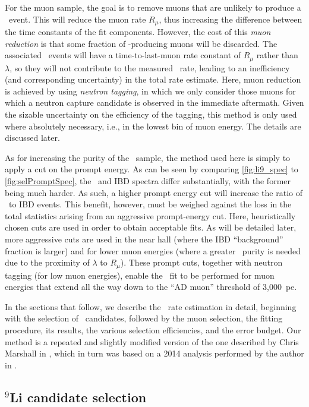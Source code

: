 \documentclass[../thesis.tex]{subfiles}
\begin{document}
For the muon sample, the goal is to remove muons that are unlikely to produce a \linine\ event. This will reduce the muon rate $R_\mu$, thus increasing the difference between the time constants of the fit components. However, the cost of this \emph{muon reduction} is that some fraction of \linine-producing muons will be discarded. The associated \linine\ events will have a time-to-last-muon rate constant of $R_\mu$ rather than $\lambda$, so they will not contribute to the measured \linine\ rate, leading to an inefficiency (and corresponding uncertainty) in the total rate estimate. Here, muon reduction is achieved by using \emph{neutron tagging}, in which we only consider those muons for which a neutron capture candidate is observed in the immediate aftermath. Given the sizable uncertainty on the efficiency of the tagging, this method is only used where absolutely necessary, i.e., in the lowest bin of muon energy. The details are discussed later.

As for increasing the purity of the \linine\ sample, the method used here is simply to apply a cut on the prompt energy. As can be seen by comparing \autoref{fig:li9_spec} to \autoref{fig:selPromptSpec}, the \linine\ and IBD spectra differ substantially, with the former being much harder. As such, a higher prompt energy cut will increase the ratio of \linine\ to IBD events. This benefit, however, must be weighed against the loss in the total statistics arising from an aggressive prompt-energy cut. Here, heuristically chosen cuts are used in order to obtain acceptable fits. As will be detailed later, more aggressive cuts are used in the near hall (where the IBD ``background'' fraction is larger) and for lower muon energies (where a greater \linine\ purity is needed due to the proximity of $\lambda$ to $R_\mu$). These prompt cuts, together with neutron tagging (for low muon energies), enable the \linine\ fit to be performed for muon energies that extend all the way down to the ``AD muon'' threshold of 3,000~pe.

In the sections that follow, we describe the \linine\ rate estimation in detail, beginning with the selection of \linine\ candidates, followed by the muon selection, the fitting procedure, its results, the various selection efficiencies, and the error budget. Our method is a repeated and slightly modified version of the one described by Chris Marshall in \cite{ChrisLi9}, which in turn was based on a 2014 analysis performed by the author in \cite{MattLi9}.

\subsection{$^9$Li candidate selection}
\label{sec:bkgLi9Sel}
\end{document}
